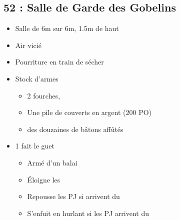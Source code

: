 \subsection{52 : Salle de Garde des Gobelins}\label{n3:s52}
\begin{itemize}
  \item Salle de 6m sur 6m, 1.5m de haut 
  \item Air vicié
  \item Pourriture en train de sécher
  \item Stock d'armes \textbf{}
  \begin{itemize}
    \item 2 fourches, 
    \item Une pile de couverts en argent (200 PO)
    \item des douzaines de bâtons affûtés
  \end{itemize}
  \item 1 \textbf{} fait le guet
  \begin{itemize}
    \item Armé d'un balai
    \item \'Eloigne les \textbf{}
    \item Repousse les PJ si arrivent du \textbf{}
    \item S'enfuit en hurlant si les PJ arrivent du 
  \end{itemize}
\end{itemize}
